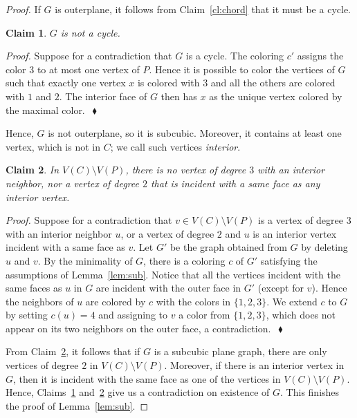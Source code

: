 \documentclass[a4paper,12pt]{article}
\newtheorem{claim}{Claim}
\newenvironment{proofclaim}[1][]%
    {\noindent \emph{Proof.} {}{#1}{}}{$~$\hfill $~\blacklozenge$ \vspace{0.2cm}}
\begin{document}
\begin{proof}
If $G$ is outerplane, it follows from Claim~\ref{cl:chord} that it must be a cycle.

\begin{claim}
	\label{cl:cycle}
	$G$ is not a cycle.
\end{claim}

\begin{proofclaim}
	Suppose for a contradiction that $G$ is a cycle.
	The coloring $c'$ assigns the color $3$ to at most one vertex of $P$.
	Hence it is possible to color the vertices of $G$ such that exactly one vertex $x$
	is colored with $3$ and all the others are colored with $1$ and $2$.
	The interior face of $G$ then has $x$ as the unique vertex colored by the maximal color.
\end{proofclaim}

Hence, $G$ is not outerplane, so it is subcubic.
Moreover, it contains at least one vertex, which is not in $C$; we call such vertices \emph{interior}.

\begin{claim}
	\label{mainclaim}
	In $V(C) \setminus V(P)$, there is no vertex of degree $3$  with an interior neighbor,
	nor a vertex of degree $2$ that is incident with a same face as any interior vertex.
\end{claim}

\begin{proofclaim}
	Suppose for a contradiction that $v \in V(C) \setminus V(P)$ is a vertex of degree $3$ with an interior neighbor $u$,
	or a vertex of degree $2$ and $u$ is an interior vertex incident with a same face as $v$.
	Let $G'$ be the graph obtained from $G$ by deleting $u$ and $v$.
	By the minimality of $G$, there is a coloring $c$ of $G'$ satisfying the assumptions of Lemma~\ref{lem:sub}.
	Notice that all the vertices incident with the same faces as $u$ in $G$ are incident with the outer face in $G'$ (except for $v$).
	Hence the neighbors of $u$ are colored by $c$ with the colors in $\{1,2,3\}$.
	We extend $c$ to $G$ by setting $c(u)=4$ and assigning to $v$ a color from $\{1,2,3\}$, which does not appear on its two neighbors on the outer face,
	a contradiction.
\end{proofclaim}

From Claim~\ref{mainclaim}, it follows that if $G$ is a subcubic plane graph,
there are only vertices of degree $2$ in $V(C) \setminus V(P)$. Moreover,
if there is an interior vertex in $G$, then it is incident with the same face as one
of the vertices in $V(C) \setminus V(P)$.
Hence, Claims~\ref{cl:cycle} and~\ref{mainclaim} give us a contradiction on existence of $G$.
This finishes the proof of Lemma~\ref{lem:sub}.
\end{proof}
\end{document}
